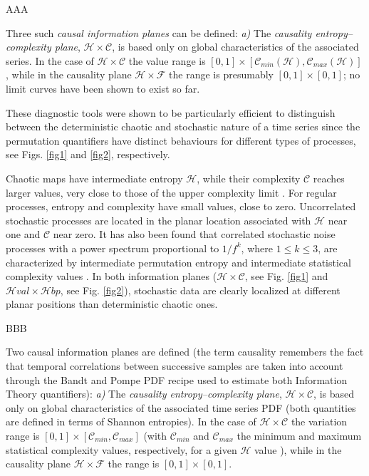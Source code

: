 AAA


Three such \textit{causal information planes} can be defined: 
{\it a)\/} The {\it causality entropy--complexity plane\/}, ${\mathcal H} \times {\mathcal C}$, is based 
only on global characteristics of the  associated series.
In the case of ${\mathcal H} \times {\mathcal C}$ the value range is $[0, 1] \times [{\mathcal C}_{min}(\mathcal{H}), 
{\mathcal C}_{max}(\mathcal{H})]$, while in the causality 
plane ${\mathcal H} \times {\mathcal F}$ the range is presumably $[0, 1]\times [0, 1]$; no limit curves have been shown to exist so far.

These diagnostic tools were shown to be particularly efficient to distinguish between the deterministic chaotic and stochastic nature of a time series since the permutation quantifiers have distinct behaviours for different types of processes, see Figs. \ref{fig1} and \ref{fig2}, respectively. 

Chaotic maps have intermediate entropy ${\mathcal H}$, while their complexity ${\mathcal C}$ reaches larger values, very close to those of the upper complexity limit \cite{Rosso2007,Olivares2012B}.
For regular processes, entropy and complexity have small values, close to zero. 
Uncorrelated stochastic processes are located in the planar location associated with ${\mathcal H}$ near one and ${\mathcal C}$ near zero.
It has also been found that correlated stochastic noise processes with a power spectrum proportional to $1/f^k$, where $1 \leq k \leq 3$, are characterized by intermediate permutation entropy and intermediate statistical complexity values \cite{Rosso2007}.
In both information planes (${\mathcal H} \times {\mathcal C}$, see Fig. \ref{fig1} and  ${\mathcal Hval} \times {\mathcal Hbp}$, see Fig. \ref{fig2}), stochastic data are clearly localized at different planar positions than deterministic chaotic ones. 

BBB

Two causal information planes are defined (the term causality remembers the fact that temporal correlations 
between successive samples are taken into account through the Bandt and Pompe PDF recipe used to
estimate both Information Theory quantifiers):
{\it a)\/} The {\it causality entropy--complexity plane\/}, ${\mathcal H} \times {\mathcal C}$, is based 
only on global characteristics of the associated time series PDF (both quantities are defined in terms of 
Shannon entropies).
In the case of ${\mathcal H} \times {\mathcal C}$ the variation range is $[0, 1] \times [{\mathcal C}_{min}, 
{\mathcal C}_{max}]$ (with ${\mathcal C}_{min}$ and ${\mathcal C}_{max}$ the minimum and maximum statistical 
complexity values, respectively, for a given ${\mathcal H}$ value \cite{Martin2006}), while in the causality 
plane ${\mathcal H} \times {\mathcal F}$ the range is $[0, 1]\times [0, 1]$.

